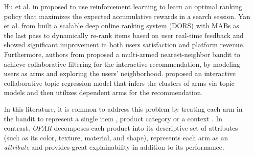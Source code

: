 \documentclass[11pt, dvipdfmx]{article}
\begin{document}
Hu et al. in \cite{KDD18_TaobaoSearch_RL} proposed to use reinforcement learning to learn an optimal ranking policy that maximizes the expected accumulative rewards in a search session. 
Yan et al. from \cite{MLKD19_JD_onlineRanking} built a scalable deep online ranking system (DORS) with MABs as the last pass to dynamically re-rank items based on user real-time feedback and showed significant improvement in both users satisfaction and platform revenue. 
Furthermore, authors from \cite{recsys19_interativeRecs} proposed a multi-armed nearest-neighbor bandit to achieve collaborative filtering for the interactive recommendation, by modeling users as arms and exploring the users' neighborhood. \cite{IEEE19_onlineInterativeCF} proposed an interactive collaborative topic regression model that infers the clusters of arms via topic models \cite{LDA} and then utilizes dependent arms for the recommendation. 

In this literature, it is common to address this problem by treating each arm in the bandit to represent a single item \cite{kdd20_sequentialRec}, product category \cite{MLKD19_JD_onlineRanking} or a context  \cite{KDD18_TaobaoSearch_RL,li2017contextaware,ICML16_contextCascadingBandits}. In contrast, \emph{OPAR} decomposes each product into its descriptive set of attributes (such as its color, texture, material, and shape), represents each arm as an \emph{attribute} and provides great explainability in addition to its performance. 
\end{document}
